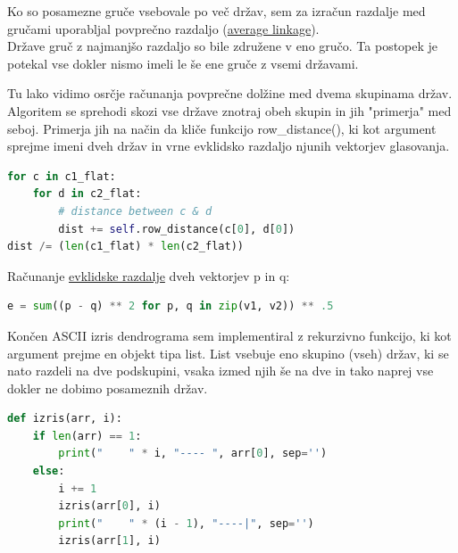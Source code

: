 \documentclass[a4paper,11pt]{article}
\begin{document}
Ko so posamezne gruče vsebovale po več držav, sem za izračun razdalje med gručami uporabljal povprečno razdaljo
(\href{https://www.statistics.com/glossary/average-linkage-clustering/}{average linkage}).
\\Države gruč z najmanjšo razdaljo so bile združene v eno gručo. Ta postopek je potekal vse dokler nismo imeli le še ene
gruče z vsemi državami.

Tu lako vidimo osrčje računanja povprečne dolžine med dvema skupinama držav. Algoritem se sprehodi skozi vse države znotraj
obeh skupin in jih "primerja" med seboj. Primerja jih na način da kliče funkcijo row\_distance(), ki kot argument sprejme
imeni dveh držav in vrne evklidsko razdaljo njunih vektorjev glasovanja.

\begin{lstlisting}[language=Python, caption=merge\_clusters(clusters{,} c1{,} c2)]
for c in c1_flat:
    for d in c2_flat:
        # distance between c & d
        dist += self.row_distance(c[0], d[0])
dist /= (len(c1_flat) * len(c2_flat))
\end{lstlisting}

Računanje \href{https://en.wikipedia.org/wiki/Euclidean_distance}{evklidske razdalje} dveh vektorjev p in q:

\begin{lstlisting}[language=Python, caption=Evklidska razdalja]
e = sum((p - q) ** 2 for p, q in zip(v1, v2)) ** .5
\end{lstlisting}

Končen ASCII izris dendrograma sem implementiral z rekurzivno funkcijo, ki kot argument prejme en objekt tipa list.
List vsebuje eno skupino (vseh) držav, ki se nato razdeli na dve podskupini, vsaka izmed njih še na dve in tako naprej
vse dokler ne dobimo posameznih držav.
\pagebreak
\begin{lstlisting}[language=Python, caption=Rekurzivna funkcija izris()]
def izris(arr, i):
    if len(arr) == 1:
        print("    " * i, "---- ", arr[0], sep='')
    else:
        i += 1
        izris(arr[0], i)
        print("    " * (i - 1), "----|", sep='')
        izris(arr[1], i)
\end{lstlisting}
\end{document}
